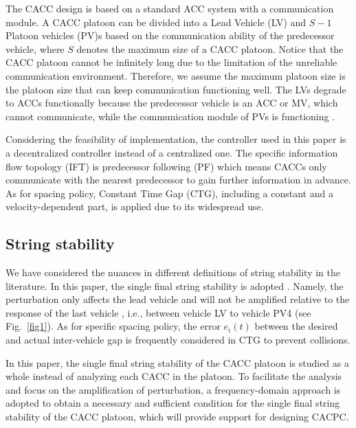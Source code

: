 \documentclass[journal]{IEEEtran}
\begin{document}
The CACC design is based on a standard ACC system with a communication module. A CACC platoon can be divided into a Lead Vehicle (LV) and $S-1$ Platoon vehicles (PV)s based on the communication ability of the predecessor vehicle, where $S$ denotes the maximum size of a CACC platoon. Notice that the CACC platoon cannot be infinitely long due to the limitation of the unreliable communication environment. Therefore, we assume the maximum platoon size is the platoon size that can keep communication functioning well. The LVs degrade to ACCs functionally because the predecessor vehicle is an ACC or MV, which cannot communicate, while the communication module of PVs is functioning \citep{dey2015review,navas2019mixing}.

Considering the feasibility of implementation, the controller used in this paper is a decentralized controller instead of a centralized one. The specific information flow topology (IFT) is predecessor following (PF) which means CACCs only communicate with the nearest predecessor to gain further information in advance. As for spacing policy, Constant Time Gap (CTG), including a constant and a velocity-dependent part, is applied due to its widespread use.

\subsection{String stability}
\label{Section 2.2}

We have considered the nuances in different definitions of string stability in the literature. In this paper, the single final string stability is adopted \citep{studli2017vehicular}. Namely, the perturbation only affects the lead vehicle and will not be amplified relative to the response of the last vehicle \citep{qin2021analytical,montanino2021homogeneous,jin2014dynamics,zhou2020stabilizing,wang2018infrastructure}, i.e., between vehicle LV to vehicle PV4 (see Fig.~\ref{fig1}). As for specific spacing policy, the error $e_i (t)$ between the desired and actual inter-vehicle gap is frequently considered in CTG to prevent collisions.

In this paper, the single final string stability of the CACC platoon is studied as a whole instead of analyzing each CACC in the platoon. To facilitate the analysis and focus on the amplification of perturbation, a frequency-domain approach is adopted to obtain a necessary and sufficient condition for the single final string stability of the CACC platoon, which will provide support for designing CACPC.
\end{document}
